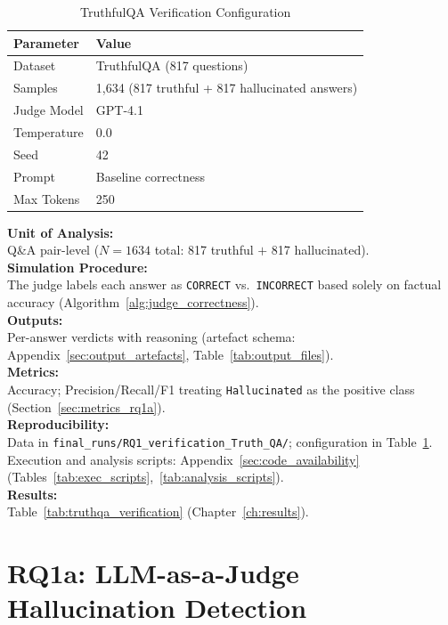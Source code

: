 \begin{table}[H]
\centering
\caption{TruthfulQA Verification Configuration}
\label{tab:truthqa_config}
\footnotesize
\begin{tabular}{@{}ll@{}}
\toprule
\textbf{Parameter} & \textbf{Value} \\
\midrule
Dataset & TruthfulQA (817 questions) \\
Samples & 1,634 (817 truthful + 817 hallucinated answers) \\
Judge Model & GPT-4.1 \\
Temperature & 0.0 \\
Seed & 42 \\
Prompt & Baseline correctness \\
Max Tokens & 250 \\
\bottomrule
\end{tabular}
\end{table}
\textbf{Unit of Analysis:}\\
Q\&A pair-level ($N=1634$ total: 817 truthful $+$ 817 hallucinated).\\
\textbf{Simulation Procedure:}\\
The judge labels each answer as \texttt{CORRECT} vs.\ \texttt{INCORRECT} based solely on factual accuracy (Algorithm~\ref{alg:judge_correctness}).\\
\textbf{Outputs:}\\
Per-answer verdicts with reasoning (artefact schema: Appendix~\ref{sec:output_artefacts}, Table~\ref{tab:output_files}).\\
\textbf{Metrics:}\\
Accuracy; Precision/Recall/F1 treating \texttt{Hallucinated} as the positive class (Section~\ref{sec:metrics_rq1a}).\\
\textbf{Reproducibility:}\\
Data in \texttt{final\_runs/RQ1\_verification\_Truth\_QA/}; configuration in Table~\ref{tab:truthqa_config}. Execution and analysis scripts: Appendix~\ref{sec:code_availability} (Tables~\ref{tab:exec_scripts},~\ref{tab:analysis_scripts}).\\
\textbf{Results:}\\
Table~\ref{tab:truthqa_verification} (Chapter~\ref{ch:results}).

\section{RQ1a: LLM-as-a-Judge Hallucination Detection}
\label{sec:rq1a_experiments}

